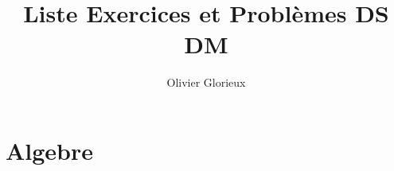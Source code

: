 \documentclass[a4paper, 11pt]{article}
\author{Olivier Glorieux}
\begin{document}
\title{Liste Exercices et Problèmes DS DM }
\vspace{-0.5cm}

\tableofcontents

\section{Algebre}




















\end{document}
